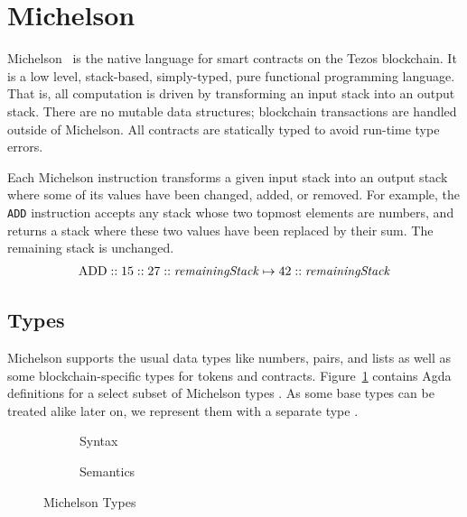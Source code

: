 \section{Michelson}
\label{sec:michelson}
\label{sec:Mtype}


Michelson~\cite{michelson,devres} is the native language for smart contracts on the Tezos blockchain.
It is a low level, stack-based, simply-typed, pure functional programming
language. That is, all computation is driven by transforming an input
stack into an output stack. There are no mutable data structures;
blockchain transactions are handled outside of Michelson.
All contracts are statically typed to avoid run-time type errors.

Each Michelson instruction transforms a given input stack into an output stack
where some of its values have been changed, added, or removed.
For example, the \verb=ADD= instruction accepts any stack
whose two topmost elements are numbers,
and returns a stack where these two values have been replaced by their sum. The remaining stack is unchanged.
\begin{align*}
	\text{ADD} :: 15 :: 27 :: \text{\emph{remainingStack}}
	\mapsto	           42 :: \text{\emph{remainingStack}}
\label{equ:ADD}
\end{align*}

\subsection{Types}
\label{sec:michelson-types}

Michelson supports the usual data types like numbers, pairs, and lists as well as
some blockchain-specific types for tokens and contracts. 
Figure~\ref{fig:Type} contains Agda definitions for a select subset of
Michelson types {\AType}. As some base types can be treated alike later on, we
represent them with a separate type {\ABaseType}.

\begin{figure}[tp]
  \begin{subfigure}{0.48\textwidth}
    \noindent
    \TypesType
    \TypesPatterns
    \caption{Syntax}
    \label{fig:Type}
  \end{subfigure}
  \begin{subfigure}{0.48\textwidth}
  \TypesSemantics
  \caption{Semantics}
  \label{fig:Type-Semantics}
\end{subfigure}
\caption{Michelson Types}
\label{Type}
\end{figure}

